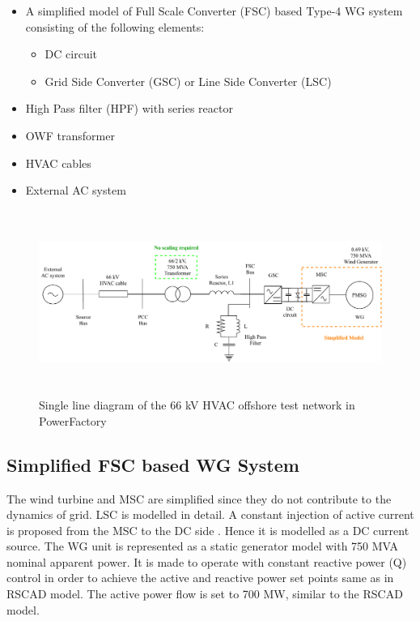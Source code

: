 \begin{itemize}
    \item A simplified model of Full Scale Converter (\gls{FSC}) based Type-4 \gls{WG} system consisting of the following elements:
    \begin{itemize}
        \item \gls{DC} circuit
        \item Grid Side Converter (\gls{GSC}) or Line Side Converter (\gls{LSC})
    \end{itemize}
    \item High Pass filter (\gls{HPF}) with series reactor
    \item \gls{OWF} transformer
    \item \gls{HVAC} cables  
    \item External \gls{AC} system
\end{itemize}

\begin{figure}[H]
    \includegraphics[height = 6cm,width = \textwidth]{Diagrams/Chapter_3/WT1_AC_PFD.pdf}
    \caption{Single line diagram of the 66 kV HVAC offshore test network in PowerFactory}
    \label{fig:WT1_Model_PFD_comp}
\end{figure}

\subsection{Simplified FSC based WG System}\label{simplified_FSC_WG}
The wind turbine and \gls{MSC} are simplified since they do not contribute to the dynamics of grid. \gls{LSC} is modelled in detail. A constant injection of active current is proposed from the \gls{MSC} to the \gls{DC} side \cite{korai_dynamic_2019}. Hence it is modelled as a \gls{DC} current source. The \gls{WG} unit is represented as a static generator model with 750 MVA nominal apparent power. It is made to operate with constant reactive power (Q) control in order to achieve the active and reactive power set points same as in RSCAD model. The active power flow is set to 700 MW, similar to the RSCAD model.

